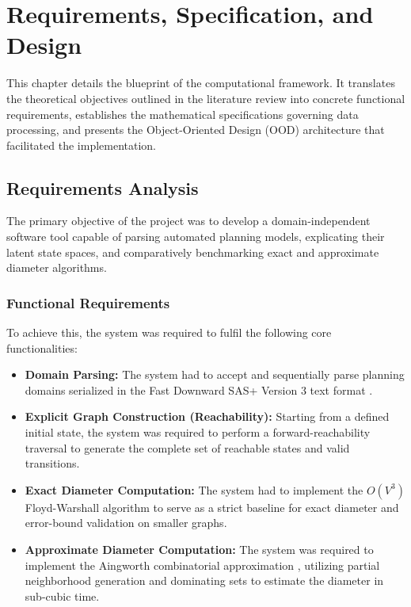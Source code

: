 \chapter{Requirements, Specification, and Design}

This chapter details the blueprint of the computational framework. It translates the theoretical objectives outlined in the literature review into concrete functional requirements, establishes the mathematical specifications governing data processing, and presents the Object-Oriented Design (OOD) architecture that facilitated the implementation.

\section{Requirements Analysis}
The primary objective of the project was to develop a domain-independent software tool capable of parsing automated planning models, explicating their latent state spaces, and comparatively benchmarking exact and approximate diameter algorithms. 

\subsection{Functional Requirements}
To achieve this, the system was required to fulfil the following core functionalities:
\begin{itemize}
    \item \textbf{Domain Parsing:} The system had to accept and sequentially parse planning domains serialized in the Fast Downward SAS+ Version 3 text format \cite{fastdownward}.
    \item \textbf{Explicit Graph Construction (Reachability):} Starting from a defined initial state, the system was required to perform a forward-reachability traversal to generate the complete set of reachable states and valid transitions.
    \item \textbf{Exact Diameter Computation:} The system had to implement the $O(V^3)$ Floyd-Warshall algorithm to serve as a strict baseline for exact diameter and error-bound validation on smaller graphs.
    \item \textbf{Approximate Diameter Computation:} The system was required to implement the Aingworth combinatorial approximation \cite{aingworth96}, utilizing partial neighborhood generation and dominating sets to estimate the diameter in sub-cubic time.
\end{itemize}

